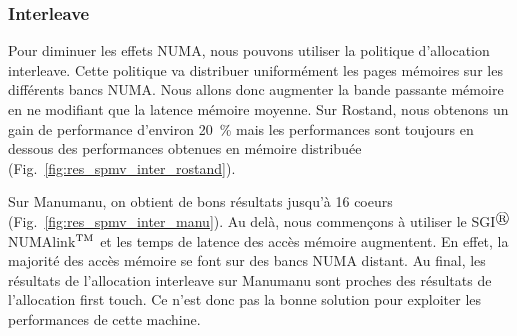 \subsubsection{Interleave}
Pour diminuer les effets NUMA, nous pouvons utiliser la politique d'allocation interleave.
%
Cette politique va distribuer uniformément les pages mémoires sur les différents bancs NUMA.
%
Nous allons donc augmenter la bande passante mémoire en ne modifiant que la latence mémoire moyenne.
%
Sur Rostand, nous obtenons un gain de performance d'environ 20~\% mais les performances sont toujours en dessous des performances obtenues en mémoire distribuée (Fig.~\ref{fig:res_spmv_inter_rostand}).

Sur Manumanu, on obtient de bons résultats jusqu'à 16 coeurs (Fig.~\ref{fig:res_spmv_inter_manu}).
%
Au delà, nous commençons à utiliser le SGI$^\registered$ NUMAlink$^{\rm TM}$\cite{numalink} et les temps de latence des accès mémoire augmentent.
%
En effet, la majorité des accès mémoire se font sur des bancs NUMA distant.
%
Au final, les résultats de l'allocation interleave sur Manumanu sont proches des résultats de l'allocation first touch.
%
Ce n'est donc pas la bonne solution pour exploiter les performances de cette machine.

